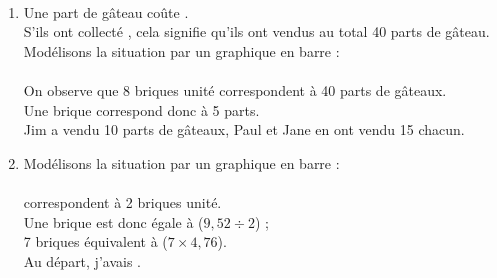 \ \\ [-5mm]
   \begin{enumerate}
      \item Une part de gâteau coûte . \\
         S'ils ont collecté , cela signifie qu'ils ont vendus au total 40 parts de gâteau. \\
         Modélisons la situation par un graphique en barre : \\ [1mm]
          \\
         On observe que 8 briques unité correspondent à 40 parts de gâteaux. \\
         Une brique correspond donc à 5 parts. \\
         {\blue Jim a vendu 10 parts de gâteaux, Paul et Jane en ont vendu 15 chacun}.
      \item Modélisons la situation par un graphique en barre : \\ [1mm]
          \\
          correspondent à 2 briques unité. \\
         Une brique est donc égale à  ($9,52\div2$) ; \\
         7 briques équivalent à  ($7\times4,76$). \\
         {\blue Au départ, j'avais .}
   \end{enumerate}
